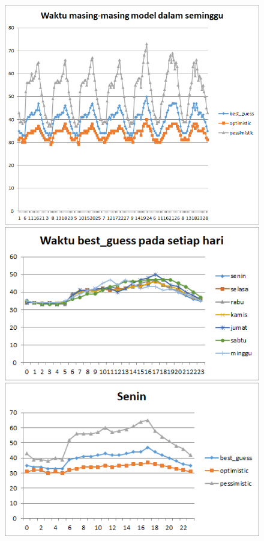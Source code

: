 \begin{figure}[H]
				\centering		
				\includegraphics[scale=0.7]{Gambar/waktuallmodelsampel224072017reverse.png}
				\includegraphics[]{Gambar/waktubestguesssampel224072017reverse.png}
				\includegraphics[]{Gambar/seninsampel224072017reverse.png}
\end{figure}
			
